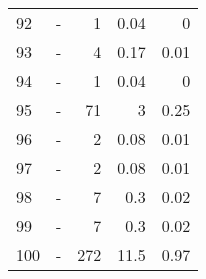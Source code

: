 \begin{longtable}{lXrrr}
        92 & \multicolumn{1}{X}{-} & %
          \num{1} &
          \num[round-mode=places,round-precision=2]{0,04} &
          \num[round-mode=places,round-precision=2]{0} \\

        93 & \multicolumn{1}{X}{-} & %
          \num{4} &
          \num[round-mode=places,round-precision=2]{0,17} &
          \num[round-mode=places,round-precision=2]{0,01} \\

        94 & \multicolumn{1}{X}{-} & %
          \num{1} &
          \num[round-mode=places,round-precision=2]{0,04} &
          \num[round-mode=places,round-precision=2]{0} \\

        95 & \multicolumn{1}{X}{-} & %
          \num{71} &
          \num[round-mode=places,round-precision=2]{3} &
          \num[round-mode=places,round-precision=2]{0,25} \\

        96 & \multicolumn{1}{X}{-} & %
          \num{2} &
          \num[round-mode=places,round-precision=2]{0,08} &
          \num[round-mode=places,round-precision=2]{0,01} \\

        97 & \multicolumn{1}{X}{-} & %
          \num{2} &
          \num[round-mode=places,round-precision=2]{0,08} &
          \num[round-mode=places,round-precision=2]{0,01} \\

        98 & \multicolumn{1}{X}{-} & %
          \num{7} &
          \num[round-mode=places,round-precision=2]{0,3} &
          \num[round-mode=places,round-precision=2]{0,02} \\

        99 & \multicolumn{1}{X}{-} & %
          \num{7} &
          \num[round-mode=places,round-precision=2]{0,3} &
          \num[round-mode=places,round-precision=2]{0,02} \\

        100 & \multicolumn{1}{X}{-} & %
          \num{272} &
          \num[round-mode=places,round-precision=2]{11,5} &
          \num[round-mode=places,round-precision=2]{0,97} \\


\end{longtable}
